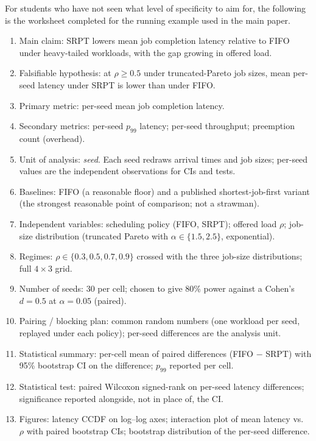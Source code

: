 \documentclass[11pt]{article}
\begin{document}
For students who have not seen what level of specificity to aim for, the
following is the worksheet completed for the running example used in the
main paper.

\begin{enumerate}[leftmargin=*, itemsep=1pt]
    \item Main claim: SRPT lowers mean job completion latency relative to FIFO under heavy-tailed workloads, with the gap growing in offered load.
    \item Falsifiable hypothesis: at $\rho \geq 0.5$ under truncated-Pareto job sizes, mean per-seed latency under SRPT is lower than under FIFO.
    \item Primary metric: per-seed mean job completion latency.
    \item Secondary metrics: per-seed $p_{99}$ latency; per-seed throughput; preemption count (overhead).
    \item Unit of analysis: \emph{seed}. Each seed redraws arrival times and job sizes; per-seed values are the independent observations for CIs and tests.
    \item Baselines: FIFO (a reasonable floor) and a published shortest-job-first variant (the strongest reasonable point of comparison; not a strawman).
    \item Independent variables: scheduling policy (FIFO, SRPT); offered load $\rho$; job-size distribution (truncated Pareto with $\alpha \in \{1.5, 2.5\}$, exponential).
    \item Regimes: $\rho \in \{0.3, 0.5, 0.7, 0.9\}$ crossed with the three job-size distributions; full $4 \times 3$ grid.
    \item Number of seeds: 30 per cell; chosen to give 80\% power against a Cohen's $d = 0.5$ at $\alpha = 0.05$ (paired).
    \item Pairing / blocking plan: common random numbers (one workload per seed, replayed under each policy); per-seed differences are the analysis unit.
    \item Statistical summary: per-cell mean of paired differences (FIFO $-$ SRPT) with 95\% bootstrap CI on the difference; $p_{99}$ reported per cell.
    \item Statistical test: paired Wilcoxon signed-rank on per-seed latency differences; significance reported alongside, not in place of, the CI.
    \item Figures: latency CCDF on log--log axes; interaction plot of mean latency vs.\ $\rho$ with paired bootstrap CIs; bootstrap distribution of the per-seed difference.

\end{enumerate}
\end{document}
